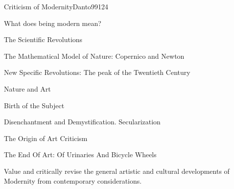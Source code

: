 \begin{syllabus}
\begin{competences}
    \item {}
    \item {}
    \item {}
    \item {}
\end{competences}

\begin{unit}{Criticism of Modernity}{}{Danto99}{12}{4}
   \begin{topics}
      \item What does being modern mean?
      \item The Scientific Revolutions
      \item The Mathematical Model of Nature: Copernico and Newton
      \item New Specific Revolutions: The peak of the Twentieth Century
      \item Nature and Art
      \item Birth of the Subject
      \item Disenchantment and Demystification. Secularization
      \item The Origin of Art Criticism
      \item The End Of Art: Of Urinaries And Bicycle Wheels    
   \end{topics}
   \begin{learningoutcomes}
      \item Value and critically revise the general artistic and cultural developments of Modernity from contemporary considerations.
   \end{learningoutcomes}
\end{unit}




\begin{coursebibliography}
\end{coursebibliography}

\end{syllabus}

